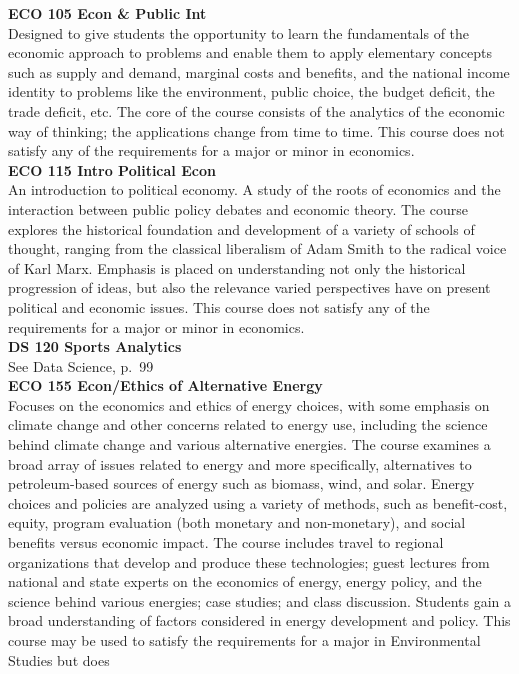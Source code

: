 \documentclass[
  letterpaper,
]{scrbook}
\begin{document}
\textbf{ECO 105 Econ \& Public Int}\\
Designed to give students the opportunity to learn the fundamentals of
the economic approach to problems and enable them to apply elementary
concepts such as supply and demand, marginal costs and benefits, and the
national income identity to problems like the environment, public
choice, the budget deficit, the trade deficit, etc. The core of the
course consists of the analytics of the economic way of thinking; the
applications change from time to time. This course does not satisfy any
of the requirements for a major or minor in economics.\\
\textbf{ECO 115 Intro Political Econ}\\
An introduction to political economy. A study of the roots of economics
and the interaction between public policy debates and economic theory.
The course explores the historical foundation and development of a
variety of schools of thought, ranging from the classical liberalism of
Adam Smith to the radical voice of Karl Marx. Emphasis is placed on
understanding not only the historical progression of ideas, but also the
relevance varied perspectives have on present political and economic
issues. This course does not satisfy any of the requirements for a major
or minor in economics.\\
\textbf{DS 120 Sports Analytics}\\
See Data Science, p.~99\\
\textbf{ECO 155 Econ/Ethics of Alternative Energy}\\
Focuses on the economics and ethics of energy choices, with some
emphasis on climate change and other concerns related to energy use,
including the science behind climate change and various alternative
energies. The course examines a broad array of issues related to energy
and more specifically, alternatives to petroleum-based sources of energy
such as biomass, wind, and solar. Energy choices and policies are
analyzed using a variety of methods, such as benefit-cost, equity,
program evaluation (both monetary and non-monetary), and social benefits
versus economic impact. The course includes travel to regional
organizations that develop and produce these technologies; guest
lectures from national and state experts on the economics of energy,
energy policy, and the science behind various energies; case studies;
and class discussion. Students gain a broad understanding of factors
considered in energy development and policy. This course may be used to
satisfy the requirements for a major in Environmental Studies but does
\end{document}
